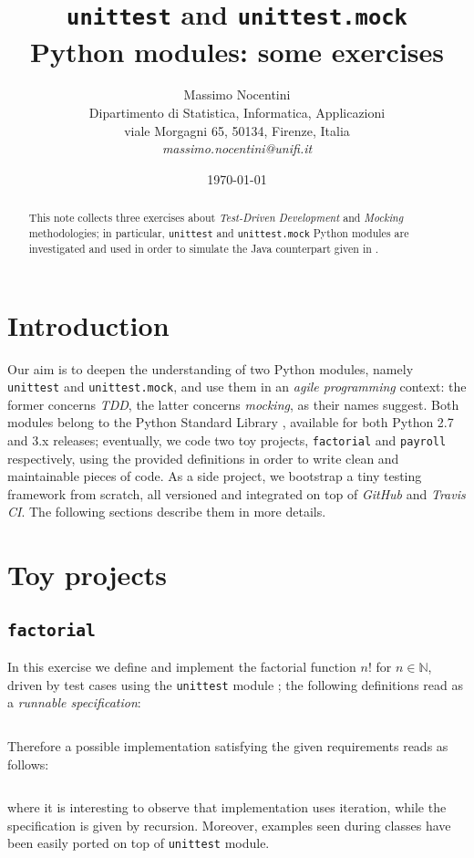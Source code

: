 \documentclass[12pt]{article}
\begin{document}
\title{\texttt{unittest} and \texttt{unittest.mock}\\ Python modules: some exercises}
\author{Massimo Nocentini\\
Dipartimento di Statistica, Informatica, Applicazioni \\ 
viale Morgagni 65, 50134, Firenze, Italia \\ 
{\sl  massimo.nocentini@unifi.it}}

\date{\today}

\maketitle

\begin{abstract}

This note collects three exercises about \textit{Test-Driven Development}
and \textit{Mocking} methodologies; in particular, \texttt{unittest} and
\texttt{unittest.mock} Python modules are investigated and used
in order to simulate the Java counterpart given in \cite{course}. 
 
\end{abstract}

\section{Introduction}

Our aim is to deepen the understanding of two Python modules, namely
\texttt{unittest} and \texttt{unittest.mock}, and use them in an \emph{agile
programming} context: the former concerns \textit{TDD}, the latter concerns
\textit{mocking}, as their names suggest.  Both modules belong to the Python
Standard Library \cite{psl}, available for both Python 2.7 and 3.x releases;
eventually, we code two toy projects, \texttt{factorial} and \texttt{payroll}
respectively, using the provided definitions in order to write clean and
maintainable pieces of code.  As a side project, we bootstrap a tiny testing
framework from scratch, all versioned and integrated on top of \emph{GitHub}
and \emph{Travis CI}. The following sections describe them in more details.

\section{Toy projects}

\subsection{\texttt{factorial}}
In this exercise we define and implement the factorial function $n!$ for $n\in\mathbb{N}$,
driven by test cases using the \texttt{unittest} module \cite{unittest}; 
the following definitions read as a \emph{runnable specification}:
\inputminted{python}{../factorial/factorial_test.py}
Therefore a possible implementation satisfying the given requirements reads as follows:
\inputminted{python}{../factorial/factorial.py}
\noindent where it is interesting to observe that implementation uses iteration, while the specification
is given by recursion. Moreover, examples seen during classes have been easily ported on top
of \texttt{unittest} module.
\end{document}
